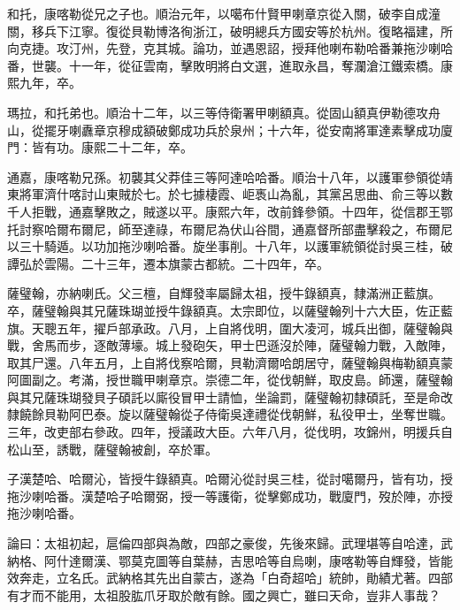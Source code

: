 \begin{pinyinscope}
和托，康喀勒從兄之子也。順治元年，以噶布什賢甲喇章京從入關，破李自成潼關，移兵下江寧。復從貝勒博洛徇浙江，破明總兵方國安等於杭州。復略福建，所向克捷。攻汀州，先登，克其城。論功，並遇恩詔，授拜他喇布勒哈番兼拖沙喇哈番，世襲。十一年，從征雲南，擊敗明將白文選，進取永昌，奪瀾滄江鐵索橋。康熙九年，卒。

瑪拉，和托弟也。順治十二年，以三等侍衛署甲喇額真。從固山額真伊勒德攻舟山，從擺牙喇纛章京穆成額破鄭成功兵於泉州；十六年，從安南將軍達素擊成功廈門：皆有功。康熙二十二年，卒。

通嘉，康喀勒兄孫。初襲其父莽佳三等阿達哈哈番。順治十八年，以護軍參領從靖東將軍濟什喀討山東賊於七。於七據棲霞、岠褭山為亂，其黨呂思曲、俞三等以數千人拒戰，通嘉擊敗之，賊遂以平。康熙六年，改前鋒參領。十四年，從信郡王鄂托討察哈爾布爾尼，師至達祿，布爾尼為伏山谷間，通嘉督所部盡擊殺之，布爾尼以三十騎遁。以功加拖沙喇哈番。旋坐事削。十八年，以護軍統領從討吳三桂，破譚弘於雲陽。二十三年，遷本旗蒙古都統。二十四年，卒。

薩璧翰，亦納喇氏。父三檀，自輝發率屬歸太祖，授牛錄額真，隸滿洲正藍旗。卒，薩璧翰與其兄薩珠瑚並授牛錄額真。太宗即位，以薩璧翰列十六大臣，佐正藍旗。天聰五年，擢戶部承政。八月，上自將伐明，圍大凌河，城兵出御，薩璧翰與戰，舍馬而步，逐敵薄壕。城上發砲矢，甲士巴遜沒於陣，薩璧翰力戰，入敵陣，取其尸還。八年五月，上自將伐察哈爾，貝勒濟爾哈朗居守，薩璧翰與梅勒額真蒙阿圖副之。考滿，授世職甲喇章京。崇德二年，從伐朝鮮，取皮島。師還，薩璧翰與其兄薩珠瑚發貝子碩託以廝役冒甲士請恤，坐論罰，薩璧翰初隸碩託，至是命改隸饒餘貝勒阿巴泰。旋以薩璧翰從子侍衛吳達禮從伐朝鮮，私役甲士，坐奪世職。三年，改吏部右參政。四年，授議政大臣。六年八月，從伐明，攻錦州，明援兵自松山至，誘戰，薩璧翰被創，卒於軍。

子漢楚哈、哈爾沁，皆授牛錄額真。哈爾沁從討吳三桂，從討噶爾丹，皆有功，授拖沙喇哈番。漢楚哈子哈爾弼，授一等護衛，從擊鄭成功，戰廈門，歿於陣，亦授拖沙喇哈番。

論曰：太祖初起，扈倫四部與為敵，四部之豪俊，先後來歸。武理堪等自哈達，武納格、阿什達爾漢、鄂莫克圖等自葉赫，吉思哈等自烏喇，康喀勒等自輝發，皆能效奔走，立名氏。武納格其先出自蒙古，遂為「白奇超哈」統帥，勛績尤著。四部有才而不能用，太祖股肱爪牙取於敵有餘。國之興亡，雖曰天命，豈非人事哉？


\end{pinyinscope}